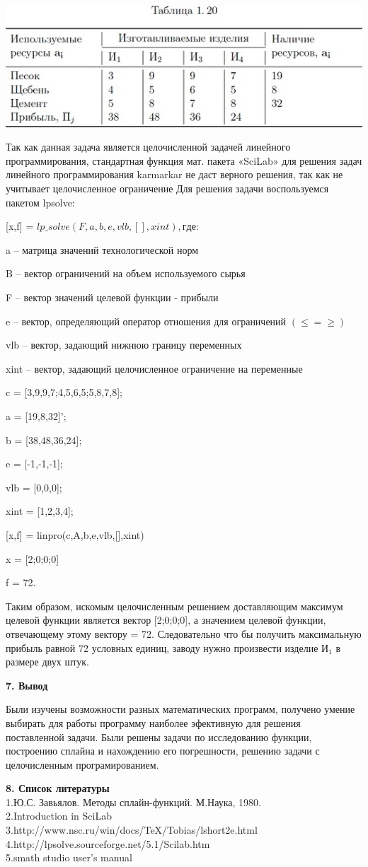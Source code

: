 \documentclass[russian,utf8,nocolumnxxxi,nocolumnxxxii]{eskdtext}
\begin{document}
\begin{center} 
\includegraphics[scale=0.7]{1} 
\end{center} 
Так как данная задача является целочисленной задачей линейного программирования, стандартная функция мат. пакета «SciLab» для решения задач линейного программирования karmarkar не даст верного решения, так как не учитывает целочисленное ограничение 
Для решения задачи воспользуемся пакетом lpsolve: 

[x,f] = $lp\_solve(F,a,b,e,vlb,[],xint), где:$ 

a – матрица значений технологической норм 

B – вектор ограничений на объем используемого сырья 

F – вектор значений целевой функции - прибыли 

e – вектор, определяющий оператор отношения для ограничений $(\leq = \geq)$ 

vlb – вектор, задающий нижнюю границу переменных 

xint – вектор, задающий целочисленное ограничение на переменные 


c = [3,9,9,7;4,5,6,5;5,8,7,8]; 

a = [19,8,32]’; 

b = [38,48,36,24]; 

e = [-1,-1,-1]; 

vlb = [0,0,0]; 

xint = [1,2,3,4]; 

[x,f] = linpro(c,A,b,e,vlb,[],xint) 

x = [2;0;0;0] 

f = 72. 

Таким образом, искомым целочисленным решением доставляющим максимум целевой функции является вектор [2;0;0;0], а значением целевой функции, отвечающему этому вектору = 72. Следовательно что бы получить максимальную прибыль равной 72 условных единиц, заводу нужно произвести изделие И$_1$ в размере двух штук.

\newpage
\begin{center} {\bf7. Вывод} \end{center}
Были изучены возможности разных математических программ, получено умение выбирать для работы программу наиболее эфективную для решения поставленной задачи. Были решены задачи по исследованию функции, построению сплайна и нахождению его погрешности, решению задачи с целочисленным програмированием.



\newpage
{\bf8. Список литературы}
\\1.Ю.С. Завьялов. Методы сплайн-функций. М.Наука, 1980.
\\2.Introduction in SciLab
\\3.http://www.nsc.ru/win/docs/TeX/Tobias/lshort2e.html
\\4.http://lpsolve.sourceforge.net/5.1/Scilab.htm
\\5.smath studio user’s manual
\end{document}
